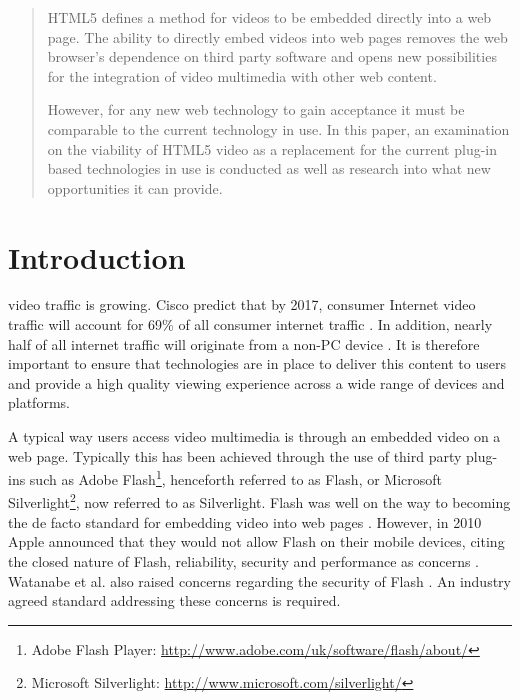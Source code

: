 \documentclass[journal]{IEEEtran}
\begin{document}







\maketitle


\begin{abstract}
HTML5 defines a method for videos to be embedded directly into a web page. The ability to directly embed videos into web pages removes the web browser's dependence on third party software and opens new possibilities for the integration of video multimedia with other web content.

However, for any new web technology to gain acceptance it must be comparable to the current technology in use. In this paper, an examination on the viability of HTML5 video as a replacement for the current plug-in based technologies in use is conducted as well as research into what new opportunities it can provide.
\end{abstract}

\IEEEpeerreviewmaketitle

\section{Introduction}
 video traffic is growing. Cisco predict that by 2017, consumer Internet video traffic will account for 69\% of all consumer internet traffic \cite{website:ciscoForecastAndMethodology}. In addition, nearly half of all internet traffic will originate from a non-PC device \cite{website:ciscoForecastAndMethodology}. It is therefore important to ensure that technologies are in place to deliver this content to users and provide a high quality viewing experience across a wide range of devices and platforms.

A typical way users access video multimedia is through an embedded video on a web page. Typically this has been achieved through the use of third party plug-ins such as Adobe Flash\footnote{Adobe Flash Player: \url{http://www.adobe.com/uk/software/flash/about/}}, henceforth referred to as Flash, or Microsoft Silverlight\footnote{Microsoft Silverlight: \url{http://www.microsoft.com/silverlight/}}, now referred to as Silverlight. Flash was well on the way to becoming the de facto standard for embedding video into web pages \cite{article:HTML5LeadsAWebRevolution}. However, in 2010 Apple announced that they would not allow Flash on their mobile devices, citing the closed nature of Flash, reliability, security and performance as concerns \cite{website:appleFlash}. Watanabe et al. also raised concerns regarding the security of Flash \cite{inproceedings:flashSecurity}. An industry agreed standard addressing these concerns is required.
\end{document}
